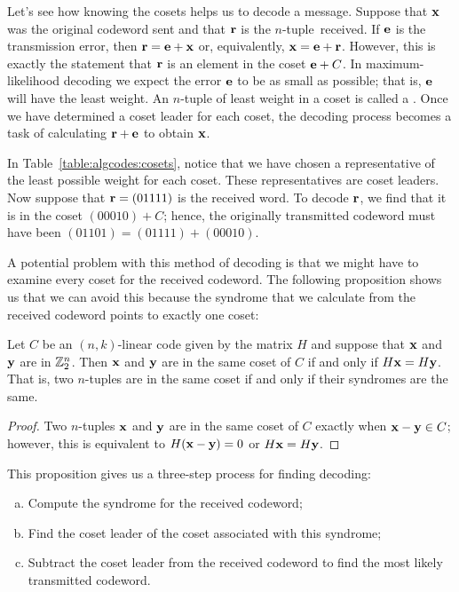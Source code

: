  
Let's see how knowing the cosets helps us to decode a
message. Suppose that ${\bold x}$ was the original codeword sent and
that ${\bold r}$ is the \mbox{$n$-tuple received}. If ${\bold e}$ is the
transmission error, then ${\bold r} = {\bold e} + {\bold x}$ or,
equivalently, ${\bold x} = {\bold e} + {\bold r}$. However, this is
exactly the statement that ${\bold r}$ is an element in the coset 
${\bold e} + C$. In maximum-likelihood decoding we expect the error
${\bold e}$ to be as small as possible; that is, ${\bold e}$ will have
the least weight. An $n$-tuple of least weight in a coset is called a
. Once we have determined a
coset leader for each coset, the decoding process becomes a task
of calculating ${\bold r} + {\bold e}$ to obtain ${\bold x}$.
 
 
\begin{example}{}
In Table~\ref{table:algcodes:cosets}, notice that we have chosen a representative of the least
possible weight for each coset.  These representatives are coset
leaders. Now suppose that ${\bold r} = (01111)$ is the received word.
To decode ${\bold r}$, we find that it is in the coset $(00010) + C$;
hence, the originally transmitted codeword must have been $(01101) =
(01111) + (00010)$. 
\end{example}
 
 
A potential problem with this method of decoding is that we might have
to examine every coset for the received codeword. The following
proposition shows us that we can avoid this because the syndrome
that we  calculate from the received codeword points to exactly one coset:

 \begin{prop}{}
Let $C$ be an $(n,k)$-linear code given by the matrix $H$ and suppose
that ${\bold x}$ and ${\bold y}$ are in ${\Bbb Z}_2^n$. Then ${\bold
x}$ and ${\bold y}$ are in the same coset of $C$ if and only if
$H{\bold x} = H{\bold y}$. That is, two $n$-tuples are in the same
coset if and only if their syndromes are the same.
\end{prop}
 
 \begin{proof}
Two $n$-tuples ${\bold x}$ and ${\bold y}$ are in the same coset of
$C$ exactly when ${\bold x} - {\bold y} \in C$; however, this is
equivalent to $H({\bold x} - {\bold y}) = 0$ or $H {\bold x} = H
{\bold y}$. 
\end{proof}

This proposition gives us a three-step process for finding decoding:
\begin{enumerate}[(a)]
\item
Compute the syndrome for the received codeword;
\item
Find the coset leader of the coset associated with this syndrome;
\item
Subtract the coset leader from the received codeword to find the most likely transmitted codeword.
\end{enumerate}


